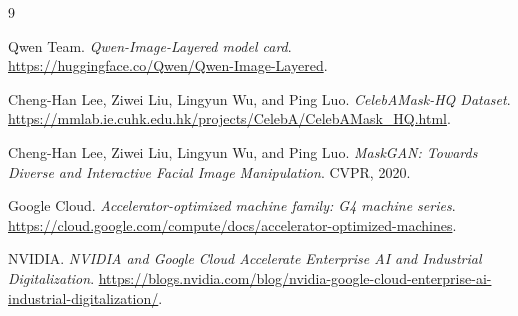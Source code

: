\documentclass[11pt]{article}
\begin{document}
\begin{thebibliography}{9}

Qwen Team.
\textit{Qwen-Image-Layered model card}.
\url{https://huggingface.co/Qwen/Qwen-Image-Layered}.

Cheng-Han Lee, Ziwei Liu, Lingyun Wu, and Ping Luo.
\textit{CelebAMask-HQ Dataset}.
\url{https://mmlab.ie.cuhk.edu.hk/projects/CelebA/CelebAMask_HQ.html}.

Cheng-Han Lee, Ziwei Liu, Lingyun Wu, and Ping Luo.
\textit{MaskGAN: Towards Diverse and Interactive Facial Image Manipulation}.
CVPR, 2020.

Google Cloud.
\textit{Accelerator-optimized machine family: G4 machine series}.
\url{https://cloud.google.com/compute/docs/accelerator-optimized-machines}.

NVIDIA.
\textit{NVIDIA and Google Cloud Accelerate Enterprise AI and Industrial Digitalization}.
\url{https://blogs.nvidia.com/blog/nvidia-google-cloud-enterprise-ai-industrial-digitalization/}.

\end{thebibliography}
\end{document}
